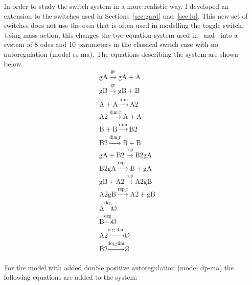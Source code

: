 In order to study the switch system in a more realistic way, I developed an extension to the switches used in Sections~\ref{sec:gard} and~\ref{sec:lu}. This new set of switches does not use the \acrfull{qssa} that is often used in modelling the toggle switch. Using mass action, this changes the two-equation system used in~\textcite{Gardner:2000vha} and~\textcite{Lu:2014kc} into a system of 8 \acrshort{ode}s and 10 parameters in the classical switch case with no autoregulation (model \acrshort{cs-ma}). The equations describing the system are shown below. 
$$
\begin{array}{cccc}
      \textrm{gA}\stackrel{\textrm{ge}}{\longrightarrow}\textrm{gA} + \textrm{A} \\
      \textrm{gB}\stackrel{\textrm{ge}}{\longrightarrow}\textrm{gB} + \textrm{B} \\
      \textrm{A} + \textrm{A} \stackrel{\textrm{dim}}{\longrightarrow}\textrm{A2} \\
      \textrm{A2} \stackrel{\textrm{dim r}}{\longrightarrow}\textrm{A} + \textrm{A} \\
      \textrm{B} + \textrm{B} \stackrel{\textrm{dim}}{\longrightarrow} \textrm{B2} \\
      \textrm{B2} \stackrel{\textrm{dim\_r}}{\longrightarrow}\textrm{B} + \textrm{B} \\
      \textrm{gA} + \textrm{B2} \stackrel{\textrm{rep}}{\longrightarrow}\textrm{B2gA} \\
      \textrm{B2gA} \stackrel{\textrm{rep\_r}}{\longrightarrow}\textrm{B} + \textrm{gA} \\
      \textrm{gB} + \textrm{A2} \stackrel{\textrm{rep}}{\longrightarrow}\textrm{A2gB} \\
      \textrm{A2gB} \stackrel{\textrm{rep\_r}}{\longrightarrow}\textrm{A2} + \textrm{gB} \\
      \textrm{A} \stackrel{\textrm{deg}}{\longrightarrow}\textrm{\O}\\
      \textrm{B} \stackrel{\textrm{deg}}{\longrightarrow}\textrm{\O}\\
      \textrm{A2} \stackrel{\textrm{deg\_dim}}{\longrightarrow} \textrm{\O}\\
      \textrm{B2} \stackrel{\textrm{deg\_dim}}{\longrightarrow}\textrm{\O}\\
\end{array}
$$

For the model with added double positive autoregulation (model \acrshort{dp-ma}) the following equations are added to the system: 

